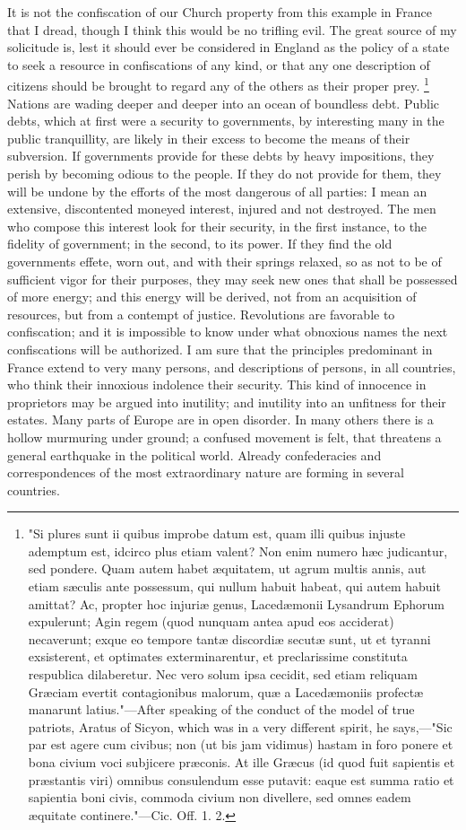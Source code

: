 It is not the confiscation of our Church property from this example in France that I dread, though I think this would be no trifling evil. The great source of my solicitude is, lest it should ever be considered in England as the policy of a state to seek a resource in confiscations of any kind, or that any one description of citizens should be brought to regard any of the others as their proper prey.
\footnote{ "Si plures sunt ii quibus improbe datum est, quam illi quibus injuste ademptum est, idcirco plus etiam valent? Non enim numero hæc judicantur, sed pondere. Quam autem habet æquitatem, ut agrum multis annis, aut etiam sæculis ante possessum, qui nullum habuit habeat, qui autem habuit amittat? Ac, propter hoc injuriæ genus, Lacedæmonii Lysandrum Ephorum expulerunt; Agin regem (quod nunquam antea apud eos acciderat) necaverunt; exque eo tempore tantæ discordiæ secutæ sunt, ut et tyranni exsisterent, et optimates exterminarentur, et preclarissime constituta respublica dilaberetur. Nec vero solum ipsa cecidit, sed etiam reliquam Græciam evertit contagionibus malorum, quæ a Lacedæmoniis profectæ manarunt latius."—After speaking of the conduct of the model of true patriots, Aratus of Sicyon, which was in a very different spirit, he says,—"Sic par est agere cum civibus; non (ut bis jam vidimus) hastam in foro ponere et bona civium voci subjicere præconis. At ille Græcus (id quod fuit sapientis et præstantis viri) omnibus consulendum esse putavit: eaque est summa ratio et sapientia boni civis, commoda civium non divellere, sed omnes eadem æquitate continere."—Cic. Off. 1. 2.}
 Nations are wading deeper and deeper into an ocean of boundless debt. Public debts, which at first were a security to governments, by interesting many in the public tranquillity, are likely in their excess to become the means of their subversion. If governments provide for these debts by heavy impositions, they perish by becoming odious to the people. If they do not provide for them, they will be undone by the efforts of the most dangerous of all parties: I mean an extensive, discontented moneyed interest, injured and not destroyed. The men who compose this interest look for their security, in the first instance, to the fidelity of government; in the second, to its power. If they find the old governments effete, worn out, and with their springs relaxed, so as not to be of sufficient vigor for their purposes, they may seek new ones that shall be possessed of more energy; and this energy will be derived, not from an acquisition of resources, but from a contempt of justice. Revolutions are favorable to confiscation; and it is impossible to know under what obnoxious names the next confiscations will be authorized. I am sure that the principles predominant in France extend to very many persons, and descriptions of persons, in all countries, who think their innoxious indolence their security. This kind of innocence in proprietors may be argued into inutility; and inutility into an unfitness for their estates. Many parts of Europe are in open disorder. In many others there is a hollow murmuring under ground; a confused movement is felt, that threatens a general earthquake in the political world. Already confederacies and correspondences of the most extraordinary nature are forming in several countries.
